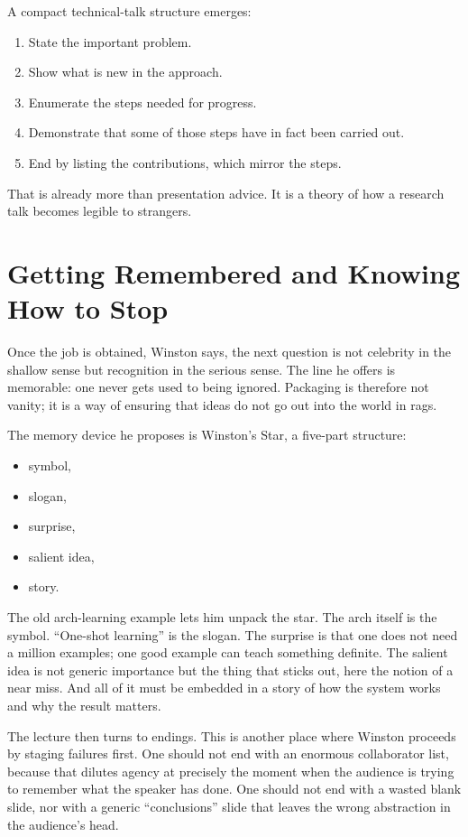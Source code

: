 A compact technical-talk structure emerges:

\begin{enumerate}
\item State the important problem.
\item Show what is new in the approach.
\item Enumerate the steps needed for progress.
\item Demonstrate that some of those steps have in fact been carried out.
\item End by listing the contributions, which mirror the steps.
\end{enumerate}

That is already more than presentation advice. It is a theory of how a research talk becomes legible to strangers.

\section{Getting Remembered and Knowing How to Stop}

Once the job is obtained, Winston says, the next question is not celebrity in the shallow sense but recognition in the serious sense. The line he offers is memorable: one never gets used to being ignored. Packaging is therefore not vanity; it is a way of ensuring that ideas do not go out into the world in rags.

The memory device he proposes is Winston's Star, a five-part structure:

\begin{itemize}
\item symbol,
\item slogan,
\item surprise,
\item salient idea,
\item story.
\end{itemize}

The old arch-learning example lets him unpack the star. The arch itself is the symbol. ``One-shot learning'' is the slogan. The surprise is that one does not need a million examples; one good example can teach something definite. The salient idea is not generic importance but the thing that sticks out, here the notion of a near miss. And all of it must be embedded in a story of how the system works and why the result matters.

The lecture then turns to endings. This is another place where Winston proceeds by staging failures first. One should not end with an enormous collaborator list, because that dilutes agency at precisely the moment when the audience is trying to remember what the speaker has done. One should not end with a wasted blank slide, nor with a generic ``conclusions'' slide that leaves the wrong abstraction in the audience's head.

